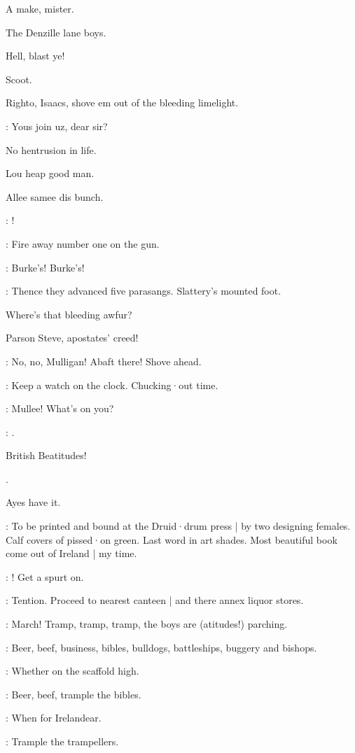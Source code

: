 A make,
mister.

The Denzille lane boys.

Hell,
blast ye!

Scoot.

Righto,
Isaacs,
shove em out of the bleeding limelight.

\punch:
Yous join uz,
dear sir?

No hentrusion in life.

Lou heap good man.

Allee samee dis bunch.

\bannon:
!

\lenehan:
Fire away number one on the gun.

\All:
Burke's!
Burke's!

:
Thence they advanced five parasangs.
Slattery's mounted foot.

Where's that bleeding awfur?

Parson Steve,
apostates' creed!

\lynch:
No,
no,
Mulligan!
Abaft there!
Shove ahead.

\lenehan:
Keep a watch on the clock.
Chucking·out time.

\madden:
Mullee!
What's on you?

\mulligan:
.

British Beatitudes!

.

Ayes have it.

\stephen:
To be printed and bound at the Druid·drum press |
by two designing females.
Calf covers of pissed·on green.
Last word in art shades.
Most beautiful book come out of Ireland |
my time.

\crotthers:
!
Get a spurt on.

\lenehan:
Tention.
Proceed to nearest canteen |
and there annex liquor stores.

\punch:
March!
Tramp,
tramp,
tramp,
the boys are
(atitudes!)
parching.

\madden:
Beer,
beef,
business,
bibles,
bulldogs,
battleships,
buggery and bishops.%

\dixon:
Whether on the scaffold high.

\madden:
Beer,
beef,
trample the bibles.

\dixon:
When for Irelandear.

\crotthers:
Trample the trampellers.

